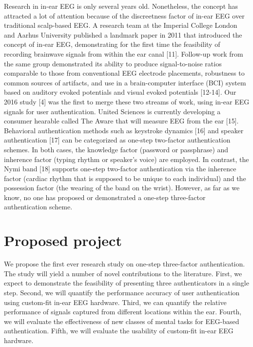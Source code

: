 \documentclass[11pt]{article}
\begin{document}
Research in in-ear EEG is only several years old. Nonetheless, the concept has
attracted a lot of attention because of the discreetness factor of in-ear EEG over
traditional scalp-based EEG. A research team at the Imperial College London
and Aarhus University published a landmark paper in 2011 that introduced the
concept of in-ear EEG, demonstrating for the first time the feasibility of recording
brainwave signals from within the ear canal [11]. Follow-up work from the same
group demonstrated its ability to produce signal-to-noise ratios comparable to
those from conventional EEG electrode placements, robustness to common
sources of artifacts, and use in a brain-computer interface (BCI) system based on
auditory evoked potentials and visual evoked potentials [12-14]. Our 2016 study
[4] was the first to merge these two streams of work, using in-ear EEG signals for
user authentication. United Sciences is currently developing a consumer
hearable called The Aware that will measure EEG from the ear [15].
Behavioral authentication methods such as keystroke dynamics [16] and speaker
authentication [17] can be categorized as one-step two-factor authentication
schemes. In both cases, the knowledge factor (password or passphrase) and
inherence factor (typing rhythm or speaker’s voice) are employed. In contrast, the
Nymi band [18] supports one-step two-factor authentication via the inherence
factor (cardiac rhythm that is supposed to be unique to each individual) and the
possession factor (the wearing of the band on the wrist). However, as far as we
know, no one has proposed or demonstrated a one-step three-factor
authentication scheme.

\section{Proposed project}
\label{sec:org6246122}

We propose the first ever research study on one-step three-factor authentication.
The study will yield a number of novel contributions to the literature. First, we
expect to demonstrate the feasibility of presenting three authenticators in a single
step. Second, we will quantify the performance accuracy of user authentication
using custom-fit in-ear EEG hardware. Third, we can quantify the relative
performance of signals captured from different locations within the ear. Fourth,
we will evaluate the effectiveness of new classes of mental tasks for EEG-based
authentication. Fifth, we will evaluate the usability of custom-fit in-ear EEG
hardware.
\end{document}

